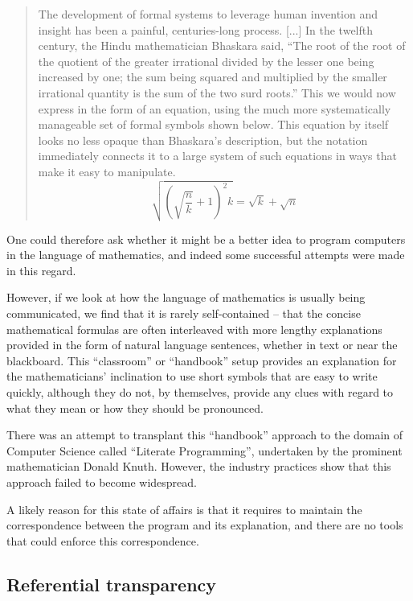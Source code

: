 \begin{quote}
  The development of formal systems to leverage human invention
  and insight has been a painful, centuries-long process. [...]
  In the twelfth century, the Hindu mathematician Bhaskara said,
  ``The root of the root of the quotient of the greater irrational
  divided by the lesser one being increased by one; the sum being
  squared and multiplied by the smaller irrational quantity is the
  sum of the two surd roots.'' This we would now express in the form
  of an equation, using the much more systematically manageable set
  of formal symbols shown below. This equation by itself looks no
  less opaque than Bhaskara's description, but the notation immediately
  connects it to a large system of such equations in ways that
  make it easy to manipulate.\cite{FauconnierTurner2002}
  \begin{equation*}
    \sqrt{(\sqrt{\frac{n}{k}}+1)^{2}k}=\sqrt{k}+\sqrt{n}
  \end{equation*}
\end{quote}

One could therefore ask whether it might be a better idea to program
computers in the language of mathematics, and indeed some successful
attempts were made in this regard.

However, if we look at how the language of mathematics is usually being
communicated, we find that it is rarely self-contained -- that the concise
mathematical formulas are often interleaved with more lengthy explanations
provided in the form of natural language sentences, whether in text
or near the blackboard. This ``classroom'' or ``handbook'' setup provides
an explanation for the mathematicians' inclination to use short symbols
that are easy to write quickly, although they do not, by themselves,
provide any clues with regard to what they mean or how they should be
pronounced.

There was an attempt to transplant this ``handbook'' approach to
the domain of Computer Science called ``Literate Programming'',
undertaken by the prominent mathematician Donald Knuth\cite{Knuth1992}.
However, the industry practices show that this approach failed to become
widespread.

A likely reason for this state of affairs is that it requires
to maintain the correspondence between the program and its explanation,
and there are no tools that could enforce this correspondence.

\subsection{Referential transparency}

